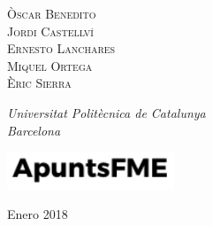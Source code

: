 \begin{titlepage}
    {\scshape\Large Òscar Benedito \\ Jordi Castellví \\ Ernesto Lanchares \\ Miquel Ortega \\ Èric Sierra \\} %

    \vspace{3\baselineskip} %

    \textit{Universitat Politècnica de Catalunya \\ Barcelona} %

    \vfill %


    \includegraphics[width=5cm]{../logo.pdf}

    \vspace{0.3\baselineskip} %
        

    Enero 2018 %


\end{titlepage}
